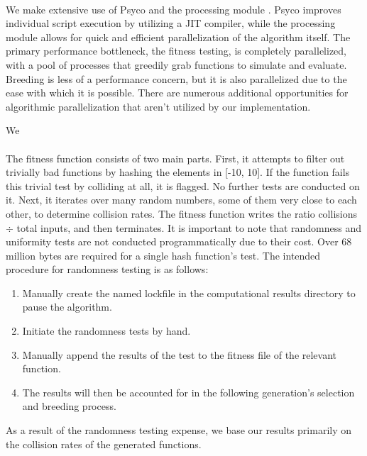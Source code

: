 \documentclass{article}
\begin{document}
\paragraph{}
We make extensive use of Psyco \cite{Psyco} and the processing module \cite{Processing}. Psyco improves individual script execution by utilizing a JIT compiler, while the processing module allows for quick and efficient parallelization of the algorithm itself.
The primary performance bottleneck, the fitness testing, is completely parallelized, with a pool of processes that greedily grab functions to simulate and evaluate. Breeding is less of a performance concern, but it is also parallelized due to the ease with which it is possible. There are numerous additional opportunities for algorithmic parallelization that aren't utilized by our implementation.

We 

\paragraph{}
The fitness function consists of two main parts. First, it attempts to filter out trivially bad functions by hashing the elements in [-10, 10]. If the function fails this trivial test by colliding at all, it is flagged. No further tests are conducted on it.
Next, it iterates over many random numbers, some of them very close to each other, to determine collision rates.
The fitness function writes the ratio collisions $\div$ total inputs, and then terminates.
It is important to note that randomness and uniformity tests are not conducted programmatically due to their cost. Over 68 million bytes are required for a single hash function's test. The intended procedure for randomness testing is as follows: 
\begin{enumerate}
	\item Manually create the named lockfile in the computational results directory to pause the algorithm.
	\item Initiate the randomness tests by hand.
	\item Manually append the results of the test to the fitness file of the relevant function. 
	\item The results will then be accounted for in the following generation's selection and breeding process.
\end{enumerate}

As a result of the randomness testing expense, we base our results primarily on the collision rates of the generated functions.
\end{document}
